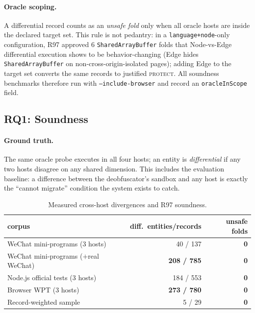\documentclass[sigconf,nonacm]{acmart}
\begin{document}
\paragraph{Oracle scoping.} A differential record counts as an \emph{unsafe fold} only when all oracle hosts are inside the declared target set. This rule is not pedantry: in a \texttt{language+node}-only configuration, R97 approved 6 \texttt{SharedArrayBuffer} folds that Node-vs-Edge differential execution shows to be behavior-changing (Edge hides \texttt{SharedArrayBuffer} on non-cross-origin-isolated pages); adding Edge to the target set converts the same records to justified \textsc{protect}. All soundness benchmarks therefore run with \texttt{--include-browser} and record an \texttt{oracleInScope} field.

\subsection{RQ1: Soundness}\label{sec:rq1}

\paragraph{Ground truth.} The same oracle probe executes in all four hosts; an entity is \emph{differential} if any two hosts disagree on any shared dimension. This includes the evaluation baseline: a difference between the deobfuscator's sandbox and any host is exactly the ``cannot migrate'' condition the system exists to catch.

\begin{table}[t]
  \centering
  \caption{Measured cross-host divergences and R97 soundness.}
  \label{tab:soundness}
  \small
  \begin{tabular}{lrr}
    \toprule
    corpus & diff.\ entities/records & unsafe folds \\
    \midrule
    WeChat mini-programs (3 hosts) & 40 / 137 & \textbf{0} \\
    WeChat mini-programs ($+$real WeChat) & \textbf{208 / 785} & \textbf{0} \\
    Node.js official tests (3 hosts) & 184 / 553 & \textbf{0} \\
    Browser WPT (3 hosts) & \textbf{273 / 780} & \textbf{0} \\
    Record-weighted sample & 5 / 29 & \textbf{0} \\
    \bottomrule
  \end{tabular}
\end{table}
\end{document}
